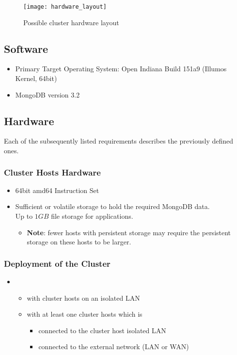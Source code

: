 \documentclass[a4paper, 11pt]{article}
\begin{document}
\begin{figure}[H]
	\centering
	\texttt{[image: hardware\_layout]}
	\caption{Possible cluster hardware layout}
\end{figure}

\subsection{Software}\label{subsec:Software}
\begin{itemize}
\item Primary Target Operating System: Open Indiana Build 151a9 (Illumos Kernel, 64bit)
\item MongoDB version 3.2
\end{itemize}

\subsection{Hardware}

Each of the subsequently listed requirements describes the previously defined ones.

\subsubsection{Cluster Hosts Hardware}
\begin{itemize}
	\item 64bit amd64 Instruction Set
	\item Sufficient  or \gls{volatile storage} to hold the required \gls{MongoDB} data. \\
	      Up to $1GB$ file storage for \mamid applications.
	\begin{itemize}
		\item \textbf{Note}: fewer \glspl{host} with \gls{persistent storage} may require the \gls{persistent storage} on these \glspl{host} to be larger.
	\end{itemize}
\end{itemize}

\subsubsection{Deployment of the Cluster}
\begin{itemize}
	\item {}
	\begin{itemize}
		\item with \gls{cluster} \glspl{host} on an isolated \acrshort{LAN}
		\item with at least one \gls{cluster} \glspl{host} which is
		\begin{itemize}
			\item connected to the \gls{cluster} \gls{host} isolated \acrshort{LAN}
			\item connected to the external network (\acrshort{LAN} or \acrshort{WAN})
		\end{itemize}
	\end{itemize}
\end{itemize}
\end{document}
